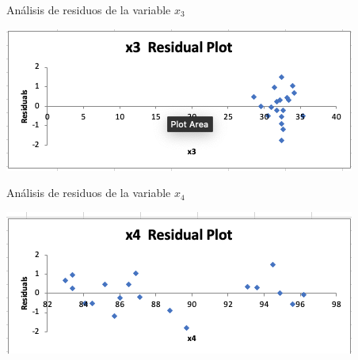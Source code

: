 \documentclass[a4paper,12pt]{article}
\begin{document}
Análisis de residuos de la variable $x_3$
 \begin{center}
        \includegraphics[scale=0.5]{res1.png}
\end{center}
Análisis de residuos de la variable $x_4$
\begin{center}
        \includegraphics[scale=0.5]{res2.png}
\end{center}
\end{document}
